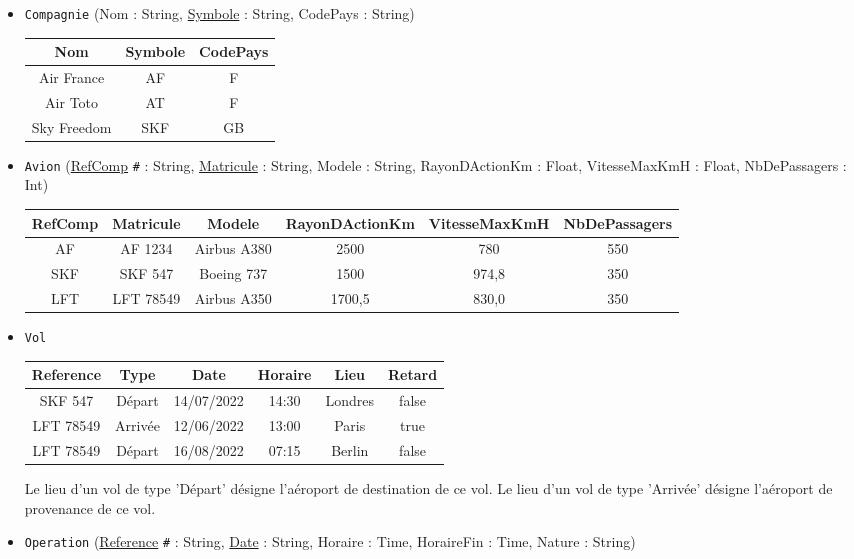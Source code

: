 \documentclass[11pt,a4paper,french,twoside]{PMCours}
\begin{document}
\begin{itemize}
\item \verb'Compagnie' (Nom : String, \underline{Symbole} : String, CodePays : String)
\begin{center}
\begin{tabular}{|c|c|c|}\hline
Nom & Symbole & CodePays\\\hline
Air France & AF & F\\\hline
Air Toto & AT & F\\\hline
Sky Freedom & SKF & GB\\\hline
\end{tabular}
\end{center}
\item \verb'Avion' (\underline{RefComp} \verb'#' : String, \underline{Matricule} : String, Modele : String, RayonDActionKm : Float, VitesseMaxKmH : Float, NbDePassagers : Int)
\begin{center}
\begin{tabular}{|c|c|c|c|c|c|}\hline
RefComp & Matricule & Modele & RayonDActionKm & VitesseMaxKmH & NbDePassagers\\\hline
AF & AF 1234 & Airbus A380 & 2500 & 780 & 550\\\hline
SKF & SKF 547 & Boeing 737 & 1500 & 974,8 & 350\\\hline
LFT & LFT 78549 & Airbus A350 & 1700,5 & 830,0 & 350\\\hline
\end{tabular}
\end{center}
\item \verb'Vol' \\
\begin{center}
\begin{tabular}{|c|c|c|c|c|c|}\hline
Reference & Type & Date & Horaire & Lieu & Retard\\\hline
SKF 547 & Départ & 14/07/2022 & 14:30 & Londres & false\\\hline
LFT 78549 & Arrivée & 12/06/2022 & 13:00 & Paris & true\\\hline
LFT 78549 & Départ & 16/08/2022 & 07:15 & Berlin & false\\\hline
\end{tabular}
\end{center}
Le lieu d'un vol de type 'Départ' désigne l'aéroport de destination de ce vol. Le lieu d'un vol de type 'Arrivée' désigne l'aéroport de provenance de ce vol. 
\item \verb'Operation' (\underline{Reference} \verb'#' : String, \underline{Date} : String, Horaire : Time, HoraireFin : Time, Nature : String)

\end{itemize}
\end{document}
